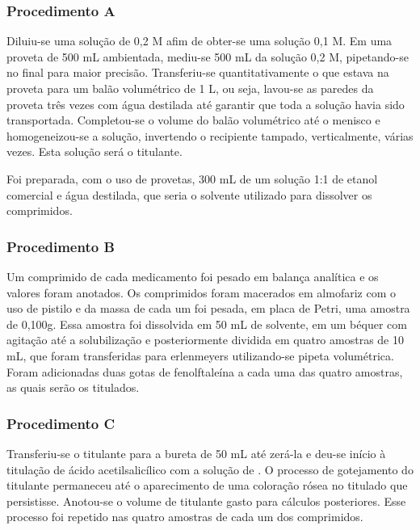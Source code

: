      \subsubsection{Procedimento A}\label{ProcedimentoA}

     Diluiu-se uma solução de  0,2 M afim de obter-se uma solução 0,1 M. Em uma proveta de 500 mL 
     ambientada, mediu-se 500 mL da solução 0,2 M, pipetando-se no final para maior precisão. 
     Transferiu-se quantitativamente o que estava na proveta para um balão volumétrico de 1 L, ou seja, 
     lavou-se as paredes da proveta três vezes com água destilada até garantir que toda a solução havia sido 
     transportada. Completou-se o volume do balão volumétrico até o menisco e homogeneizou-se a 
     solução, invertendo o recipiente tampado, verticalmente, várias vezes. Esta solução será o titulante.

     Foi preparada, com o uso de provetas, 300 mL de um solução 1:1 de etanol comercial e água destilada, 
     que seria o solvente utilizado para dissolver os comprimidos. 

     \subsubsection{Procedimento B}\label{ProcedimentoB}

     Um comprimido de cada medicamento foi pesado em balança analítica e os valores foram anotados. Os 
     comprimidos foram macerados em almofariz com o uso de pistilo e da massa de cada um foi pesada,
     em placa de Petri, uma amostra de 0,100g. Essa amostra foi dissolvida em 50 mL de solvente, em um béquer
     com agitação até a solubilização e posteriormente dividida em quatro amostras de 10 mL, que foram 
     transferidas para erlenmeyers utilizando-se pipeta volumétrica. Foram adicionadas duas gotas de 
     fenolftaleína a cada uma das quatro amostras, as quais serão os titulados.

     \subsubsection{Procedimento C}\label{ProcedimentoC}

     Transferiu-se o titulante para a bureta de 50 mL até zerá-la e deu-se início à titulação de ácido 
     acetilsalicílico com a solução de . O processo de gotejamento do titulante permaneceu até 
     o aparecimento de uma coloração rósea no titulado que persistisse. Anotou-se o volume de titulante gasto 
     para cálculos posteriores. Esse processo foi repetido nas quatro amostras de cada um dos comprimidos.

